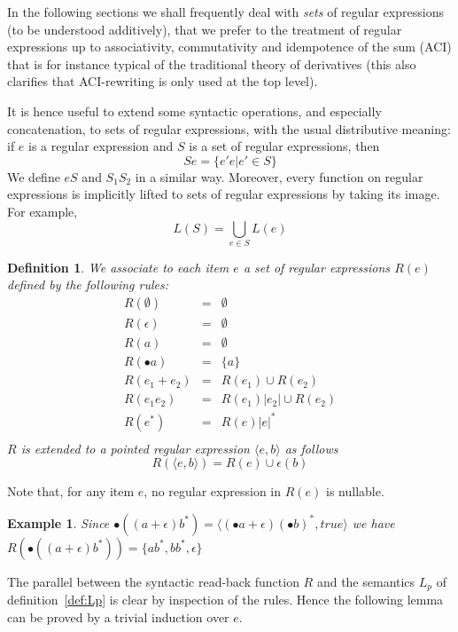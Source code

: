 \documentclass[preprint]{sigplanconf}
\newcommand{\true}{\mathit{true}}
\newcounter{item}
\newtheorem{definition}[item]{Definition}
\newtheorem{example}[item]{Example}
\begin{document}
In the following sections we shall frequently deal with {\em sets} of
regular expressions (to be understood additively), that we prefer to 
the treatment of regular expressions up to associativity, 
commutativity and idempotence of the sum (ACI) that is for instance typical
of the traditional theory of derivatives (this also clarifies that 
ACI-rewriting is only used at the top level). 

It is hence useful to extend some syntactic operations, and 
especially concatenation, to sets of regular expressions, with 
the usual distributive meaning: 
if $e$ is a regular expression and $S$ is a set of regular 
expressions, then 
\[Se = \{e'e | e' \in S\} \]
We define $eS$ and $S_1S_2$ in a similar way. Moreover, every function
on regular expressions is implicitly lifted to sets of regular expressions by
taking its image. For example, \[ L(S) = \bigcup_{e \in S} L(e) \]

\begin{definition}
We associate to each item $e$ a set of regular expressions 
$R(e)$ defined by the
following rules:
\[
\begin{array}{rcl}
R(\emptyset) &=& \emptyset\\
R(\epsilon) &=& \emptyset\\
R(a) &=& \emptyset\\
R(\bullet a) &=& \{a\}\\
R(e_1 + e_2) &=& R(e_1) \cup R(e_2)\\
R(e_1e_2) &=& R(e_1)|e_2| \cup R(e_2) \\ 
R(e^*) &=& R(e)|e|^*  \\ 
\end{array}
\]
$R$ is extended to a pointed regular expression $\langle e,b \rangle$ as
follows
\[R(\langle e,b \rangle) = R(e) \cup \epsilon(b)\]
\end{definition}
Note that, for any item $e$, no regular expression in $R(e)$ is nullable.

\begin{example}
Since
$
\bullet((a + \epsilon) b^*) = \langle (\bullet a + \epsilon) (\bullet b)^*,\true \rangle
$
we have
$
R(\bullet((a + \epsilon) b^*)) = \{ a b^*, bb^*, \epsilon\}
$
\end{example}

The parallel between the syntactic read-back function $R$ and the semantics
$L_p$ of definition~\ref{def:Lp} is clear by inspection of the rules. Hence
the following lemma can be proved by a trivial induction over $e$.
\end{document}
